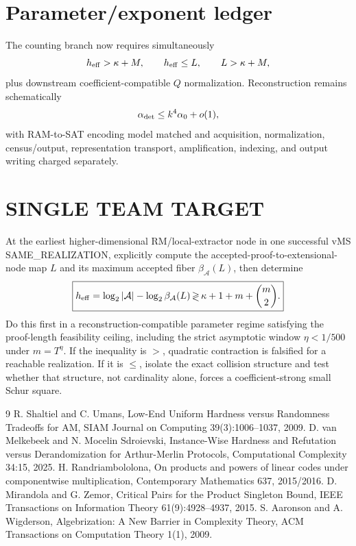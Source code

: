 \documentclass[11pt]{article}
\begin{document}
\section*{Parameter/exponent ledger}
The counting branch now requires simultaneously
\[
h_{\rm eff}>\kappa+M,\qquad
h_{\rm eff}\le L,\qquad
L>\kappa+M,
\]
plus downstream coefficient-compatible \(Q\) normalization. Reconstruction remains schematically
\[
\alpha_{\rm det}\le k^4\alpha_0+o(1),
\]
with RAM-to-SAT encoding model matched and acquisition, normalization, census/output, representation transport, amplification, indexing, and output writing charged separately.

\section*{SINGLE TEAM TARGET}
At the earliest higher-dimensional RM/local-extractor node in one successful vMS SAME_REALIZATION, explicitly compute the accepted-proof-to-extensional-node map \(L\) and its maximum accepted fiber \(\beta_{\mathcal A}(L)\), then determine
\[
\boxed{
h_{\rm eff}
=
\log_2|\mathcal A|-\log_2\beta_{\mathcal A}(L)
\mathop{\gtrless}
\kappa+1+m+\binom m2.
}
\]
Do this first in a reconstruction-compatible parameter regime satisfying the proof-length feasibility ceiling, including the strict asymptotic window \(\eta<1/500\) under \(m=T^\eta\). If the inequality is \(>\), quadratic contraction is falsified for a reachable realization. If it is \(\le\), isolate the exact collision structure and test whether that structure, not cardinality alone, forces a coefficient-strong small Schur square.

\begin{thebibliography}{9}
 R. Shaltiel and C. Umans, Low-End Uniform Hardness versus Randomness Tradeoffs for AM, SIAM Journal on Computing 39(3):1006--1037, 2009.
 D. van Melkebeek and N. Mocelin Sdroievski, Instance-Wise Hardness and Refutation versus Derandomization for Arthur-Merlin Protocols, Computational Complexity 34:15, 2025.
 H. Randriambololona, On products and powers of linear codes under componentwise multiplication, Contemporary Mathematics 637, 2015/2016.
 D. Mirandola and G. Zemor, Critical Pairs for the Product Singleton Bound, IEEE Transactions on Information Theory 61(9):4928--4937, 2015.
 S. Aaronson and A. Wigderson, Algebrization: A New Barrier in Complexity Theory, ACM Transactions on Computation Theory 1(1), 2009.
\end{thebibliography}
\end{document}
